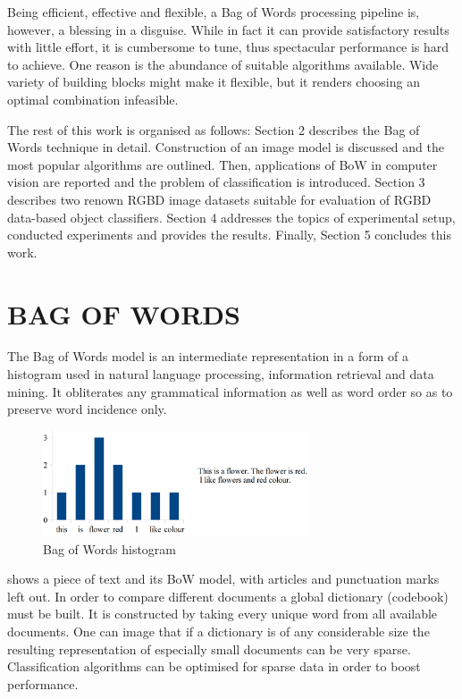 \documentclass[11pt,twoside]{article}
\begin{document}
  Being efficient, effective and flexible, a Bag of Words processing pipeline is, however, a blessing in a disguise. While in fact it can provide satisfactory results with little effort, it is cumbersome to tune, thus spectacular performance is hard to achieve. One reason is the abundance of suitable algorithms available. Wide variety of building blocks might make it flexible, but it renders choosing an optimal combination infeasible.

  The rest of this work is organised as follows: Section 2 describes the Bag of Words technique in detail. Construction of an image model is discussed and the most popular algorithms are outlined. Then, applications of BoW in computer vision are reported and the problem of classification is introduced. Section 3 describes two renown RGBD image datasets suitable for evaluation of RGBD data-based object classifiers. Section 4 addresses the topics of experimental setup, conducted experiments and provides the results. Finally, Section 5 concludes this work.

\section{ BAG OF WORDS }

  The Bag of Words model is an intermediate representation in a form of a histogram used in natural language processing, information retrieval and data mining. It obliterates any grammatical information as well as word order so as to preserve word incidence only.

  \begin{figure}[!ht]
  \centering
  \includegraphics[width=0.7\textwidth]{../figs/bow_example}
  \caption{Bag of Words histogram}
  \label{fig:bow_example}
  \end{figure}

   shows a piece of text and its BoW model, with articles and punctuation marks left out. In order to compare different documents a global dictionary (codebook) must be built. It is constructed by taking every unique word from all available documents. One can image that if a dictionary is of any considerable size the resulting representation of especially small documents can be very sparse. Classification algorithms can be optimised for sparse data in order to boost performance.
\end{document}

